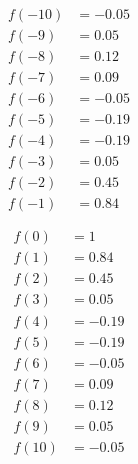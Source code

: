 \documentclass{alex_hü}
\begin{document}
\begin{enumerate}
\begin{multicols}{2}
\begin{multicols}{2}
\begin{align*}
					f\left(-10\right) &= -0.05 \\
					f\left(-9\right) &= 0.05 \\
					f\left(-8\right) &= 0.12 \\
					f\left(-7\right) &= 0.09 \\
					f\left(-6\right) &= -0.05 \\
					f\left(-5\right) &= -0.19 \\
					f\left(-4\right) &= -0.19 \\
					f\left(-3\right) &= 0.05 \\
					f\left(-2\right) &= 0.45 \\
					f\left(-1\right) &= 0.84 \\
				\end{align*}
				\columnbreak
				\begin{align*}\\
					f\left(0\right) &= 1 \\
					f\left(1\right) &= 0.84 \\
					f\left(2\right) &= 0.45 \\
					f\left(3\right) &= 0.05 \\
					f\left(4\right) &= -0.19 \\
					f\left(5\right) &= -0.19 \\
					f\left(6\right) &= -0.05 \\
					f\left(7\right) &= 0.09 \\
					f\left(8\right) &= 0.12 \\
					f\left(9\right) &= 0.05 \\
					f\left(10\right) &= -0.05 \\
				\end{align*}
			\end{multicols}
		\end{multicols}
	\end{enumerate}
	
\end{document}
